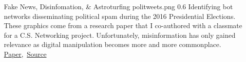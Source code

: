 \cvexample
  {Fake News, Disinfomation, \& Astroturfing}
  {politweets.png}
  {0.6}
  {%
    Identifying bot networks disseminating political spam during the 2016 Presidential Elections.
    These graphics come from a research paper that I co-authored with a classmate for a C.S. Networking project.
    Unfortunately, misinformation has only gained relevance as digital manipulation becomes more and more commonplace.\\
    \raggedleft\href{https://github.com/ryan-p-larson/polititweets/raw/master/OpinionMachine.pdf}{Paper},\, \href{https://github.com/ryan-p-larson/polititweets}{Source}\quad
  }
